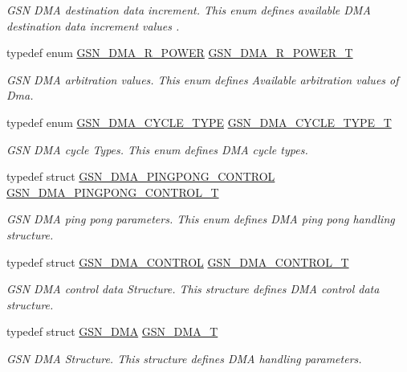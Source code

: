 \begin{DoxyCompactItemize}
\begin{DoxyCompactList}\small\item\em GSN DMA destination data increment. This enum defines available DMA destination data increment values . \end{DoxyCompactList}\item 
typedef enum \hyperlink{a00645_ga0dab047350d5c343038b0c017077dab7}{GSN\_\-DMA\_\-R\_\-POWER} \hyperlink{a00645_gadf8a8e2066de9043a495c7764612c35f}{GSN\_\-DMA\_\-R\_\-POWER\_\-T}
\begin{DoxyCompactList}\small\item\em GSN DMA arbitration values. This enum defines Available arbitration values of Dma. \end{DoxyCompactList}\item 
typedef enum \hyperlink{a00645_ga05b9b2e87ca35c2d0564ceca307d349c}{GSN\_\-DMA\_\-CYCLE\_\-TYPE} \hyperlink{a00645_gab5fced5a7e633077a493c6353edef6de}{GSN\_\-DMA\_\-CYCLE\_\-TYPE\_\-T}
\begin{DoxyCompactList}\small\item\em GSN DMA cycle Types. This enum defines DMA cycle types. \end{DoxyCompactList}\item 
typedef struct \hyperlink{a00051}{GSN\_\-DMA\_\-PINGPONG\_\-CONTROL} \hyperlink{a00645_gae146d7793ab9cfe1a37249ffc98ccf5d}{GSN\_\-DMA\_\-PINGPONG\_\-CONTROL\_\-T}
\begin{DoxyCompactList}\small\item\em GSN DMA ping pong parameters. This enum defines DMA ping pong handling structure. \end{DoxyCompactList}\item 
typedef struct \hyperlink{a00050}{GSN\_\-DMA\_\-CONTROL} \hyperlink{a00645_gad93c4855c9b915891cbdcfcdf2fd0ee5}{GSN\_\-DMA\_\-CONTROL\_\-T}
\begin{DoxyCompactList}\small\item\em GSN DMA control data Structure. This structure defines DMA control data structure. \end{DoxyCompactList}\item 
typedef struct \hyperlink{a00049}{GSN\_\-DMA} \hyperlink{a00645_ga61edafecbc46e3ba81ec48b9cf3aa1fa}{GSN\_\-DMA\_\-T}
\begin{DoxyCompactList}\small\item\em GSN DMA Structure. This structure defines DMA handling parameters. \end{DoxyCompactList}\item 

\end{DoxyCompactItemize}
